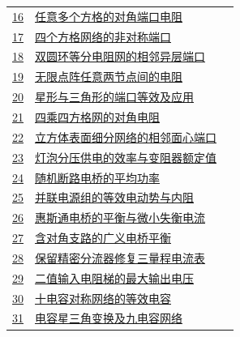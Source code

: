 \documentclass[UTF8,fontset=fandol,a4paper,11pt]{ctexart}
\begin{document}
\begin{longtable}{@{}r p{113mm} r@{}}
\hyperref[q:16]{16} & \hyperref[q:16]{任意多个方格的对角端口电阻} & \pageref{q:16} \\

\hyperref[q:17]{17} & \hyperref[q:17]{四个方格网络的非对称端口} & \pageref{q:17} \\

\hyperref[q:18]{18} & \hyperref[q:18]{双圆环等分电阻网的相邻异层端口} & \pageref{q:18} \\

\hyperref[q:19]{19} & \hyperref[q:19]{无限点阵任意两节点间的电阻} & \pageref{q:19} \\

\hyperref[q:20]{20} & \hyperref[q:20]{星形与三角形的端口等效及应用} & \pageref{q:20} \\

\hyperref[q:21]{21} & \hyperref[q:21]{四乘四方格网的对角电阻} & \pageref{q:21} \\

\hyperref[q:22]{22} & \hyperref[q:22]{立方体表面细分网络的相邻面心端口} & \pageref{q:22} \\

\hyperref[q:23]{23} & \hyperref[q:23]{灯泡分压供电的效率与变阻器额定值} & \pageref{q:23} \\

\hyperref[q:24]{24} & \hyperref[q:24]{随机断路电桥的平均功率} & \pageref{q:24} \\

\hyperref[q:25]{25} & \hyperref[q:25]{并联电源组的等效电动势与内阻} & \pageref{q:25} \\

\hyperref[q:26]{26} & \hyperref[q:26]{惠斯通电桥的平衡与微小失衡电流} & \pageref{q:26} \\

\hyperref[q:27]{27} & \hyperref[q:27]{含对角支路的广义电桥平衡} & \pageref{q:27} \\

\hyperref[q:28]{28} & \hyperref[q:28]{保留精密分流器修复三量程电流表} & \pageref{q:28} \\

\hyperref[q:29]{29} & \hyperref[q:29]{二值输入电阻梯的最大输出电压} & \pageref{q:29} \\

\hyperref[q:30]{30} & \hyperref[q:30]{十电容对称网络的等效电容} & \pageref{q:30} \\

\hyperref[q:31]{31} & \hyperref[q:31]{电容星三角变换及九电容网络} & \pageref{q:31} \\


\end{longtable}
\end{document}
